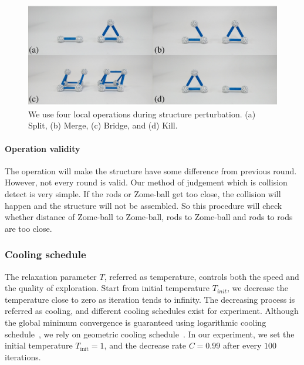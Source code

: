 \begin{figure}[ht]
\centering
\includegraphics[width=1.0\linewidth]{figs/local_opt.pdf} 
\caption{
We use four local operations during structure perturbation. (a) Split, (b) Merge, (c) Bridge, and (d) Kill.}
\label{fig:local_op}
\end{figure}

\paragraph{Operation validity}
The operation will make the structure have some difference from  previous round. However, not every round is valid. Our method of judgement which is collision detect is very simple. If the rods or Zome-ball get too close, the collision will happen and the structure will not be assembled. So this procedure will check whether  distance of Zome-ball to Zome-ball, rods to Zome-ball and rods to rods are too close.

\subsubsection{Cooling schedule}
The relaxation parameter $T$, referred as temperature, controls both the speed and the quality of exploration.
Start from  initial temperature $T_{init}$, we decrease the temperature close to zero as iteration tends to infinity.
The decreasing process is referred as cooling, and different cooling schedules  exist for experiment.
Although the global minimum convergence is guaranteed using logarithmic cooling schedule~\cite{Salamon:2002:SA}, we rely on geometric cooling schedule~\cite{Henderson:2003:SA}. 
In our experiment, we set the initial temperature $T_\text{init} = 1$, and the decrease rate $C=0.99$ after every $100$ iterations.